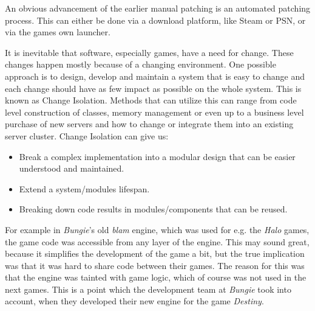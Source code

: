 An obvious advancement of the earlier manual patching is an automated patching process. This can either be done via a download platform, like Steam or PSN, or via the games own launcher.

It is inevitable that software, especially games, have a need for change. These changes happen mostly because of a changing environment.\citep{bcs_software_2015} \newline
One possible approach is to design, develop and maintain a system that is easy to change and each change should have as few impact as possible on the whole system. \citep{bcs_software_2015} This is known as Change Isolation. Methods that can utilize this can range from code level construction of classes, memory management or even up to a business level purchase of new servers and how to change or integrate them into an existing server cluster.\citep{bcs_software_2015} \newline
Change Isolation can give us:
\begin{itemize}
    \item Break a complex implementation into a modular design that can be easier understood and maintained.
    \item Extend a system/modules lifespan.
    \item Breaking down code results in modules/components that can be reused.
\end{itemize}

For example in \textit{Bungie}'s old \textit{blam} engine, which was used for e.g. the \textit{Halo} games, the game code was accessible from any layer of the engine. This may sound great, because it simplifies the development of the game a bit, but the true implication was that it was hard to share code between their games. The reason for this was that the engine was tainted with game logic, which of course was not used in the next games. This is a point which the development team at \textit{Bungie} took into account, when they developed their new engine for the game \textit{Destiny}.\citep{butcher_destiny_2015}

